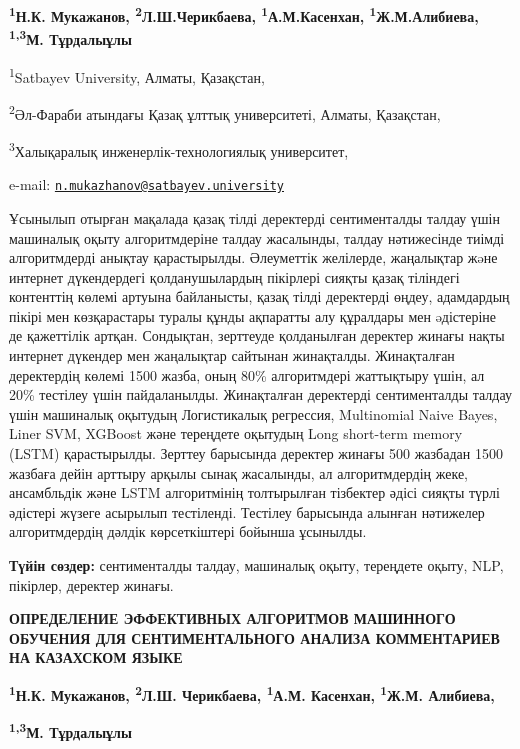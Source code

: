 {\bfseries \textsuperscript{1}Н.К. Мукажанов\textsuperscript{\envelope },
\textsuperscript{2}Л.Ш.Черикбаева, \textsuperscript{1}А.М.Касенхан,
\textsuperscript{1}Ж.М.Алибиева,\\
\textsuperscript{1,3}М. Тұрдалыұлы}

\textsuperscript{1}Satbayev University, Алматы, Қазақстан,

\textsuperscript{2}Әл-Фараби атындағы Қазақ ұлттық университеті, Алматы,
Қазақстан,

\textsuperscript{3}Халықаралық инженерлік-технологиялық университет,

e-mail:
\href{mailto:n.mukazhanov@satbayev.university}{\nolinkurl{n.mukazhanov@satbayev.university}}

Ұсынылып отырған мақалада қазақ тілді деректерді сентименталды талдау
үшін машиналық оқыту алгоритмдеріне талдау жасалынды, талдау нәтижесінде
тиімді алгоритмдерді анықтау қарастырылды. Әлеуметтік желілерде,
жаңалықтар жəне интернет дүкендердегі қолданушылардың пікірлері сияқты
қазақ тіліндегі контенттің көлемі артуына байланысты, қазақ тілді
деректерді өңдеу, адамдардың пікірі мен көзқарастары туралы құнды
ақпаратты алу құралдары мен əдістеріне де қажеттілік артқан. Сондықтан,
зерттеуде қолданылған деректер жинағы нақты интернет дүкендер мен
жаңалықтар сайтынан жинақталды. Жинақталған деректердің көлемі 1500
жазба, оның 80\% алгоритмдері жаттықтыру үшін, ал 20\% тестілеу үшін
пайдаланылды. Жинақталған деректерді сентименталды талдау үшін машиналық
оқытудың Логистикалық регрессия, Multinomial Naive Bayes, Liner SVM,
XGBoost және тереңдете оқытудың Long short-term memory (LSTM)
қарастырылды. Зерттеу барысында деректер жинағы 500 жазбадан 1500
жазбаға дейін арттыру арқылы сынақ жасалынды, ал алгоритмдердің жеке,
ансамбльдік және LSTM алгоритмінің толтырылған тізбектер әдісі сияқты
түрлі әдістері жүзеге асырылып тестіленді. Тестілеу барысында алынған
нәтижелер алгоритмдердің дәлдік көрсеткіштері бойынша ұсынылды.

{\bfseries Түйін сөздер:} сентименталды талдау, машиналық оқыту, тереңдете
оқыту, NLP, пікірлер, деректер жинағы.

{\bfseries ОПРЕДЕЛЕНИЕ ЭФФЕКТИВНЫХ АЛГОРИТМОВ МАШИННОГО ОБУЧЕНИЯ ДЛЯ
СЕНТИМЕНТАЛЬНОГО АНАЛИЗА КОММЕНТАРИЕВ НА КАЗАХСКОМ ЯЗЫКЕ}

{\bfseries \textsuperscript{1}Н.К. Мукажанов\textsuperscript{\envelope },
\textsuperscript{2}Л.Ш. Черикбаева, \textsuperscript{1}А.М. Касенхан,
\textsuperscript{1}Ж.М. Алибиева,}

{\bfseries \textsuperscript{1,3}М. Тұрдалыұлы}

